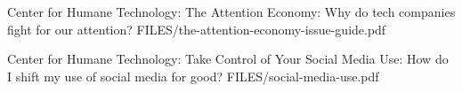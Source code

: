 {Center for Humane Technology: The Attention Economy: Why do tech companies fight for our attention?}
{FILES/the-attention-economy-issue-guide.pdf}
{\href{https://www.humanetech.com/youth/the-attention-economy}{\online}}

{Center for Humane Technology: Take Control of Your Social Media Use: How do I shift my use of social media for good?}
{FILES/social-media-use.pdf}
{\href{https://www.humanetech.com/youth/take-control-of-your-social-media-use}{\online}}
